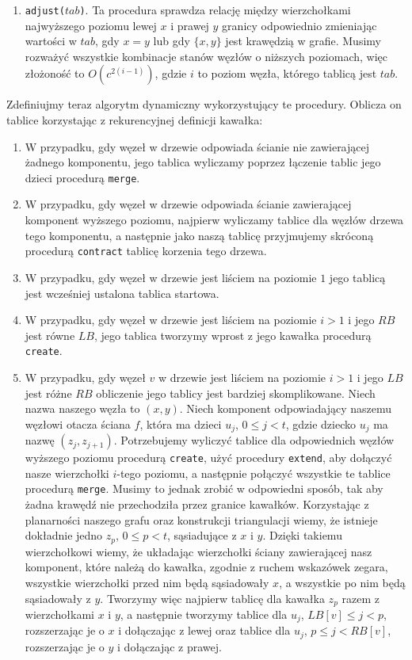 \documentclass[twoside,a4paper,12pt]{report} %
\theoremstyle{break}
\begin{document}
\begin{enumerate}
    \item \texttt{adjust($tab$)}. Ta procedura sprawdza relację między wierzchołkami najwyższego poziomu lewej $x$ i prawej $y$ granicy odpowiednio zmieniając wartości w $tab$, gdy $x=y$ lub gdy $\{x,y\}$ jest krawędzią w grafie. Musimy rozważyć wszystkie kombinacje stanów węzłów o niższych poziomach, więc złożoność to $O(c^{2(i-1)})$, gdzie $i$ to poziom węzła, którego tablicą jest $tab$.
\end{enumerate}

Zdefiniujmy teraz algorytm dynamiczny wykorzystujący te procedury. Oblicza on tablice korzystając z rekurencyjnej definicji kawałka:

\begin{enumerate}
    \item W przypadku, gdy węzeł w drzewie odpowiada ścianie nie zawierającej żadnego komponentu, jego tablica wyliczamy poprzez łączenie tablic jego dzieci procedurą \texttt{merge}.
    \item W przypadku, gdy węzeł w drzewie odpowiada ścianie zawierającej komponent wyższego poziomu, najpierw wyliczamy tablice dla węzłów drzewa tego komponentu, a następnie jako naszą tablicę przyjmujemy skróconą procedurą \texttt{contract} tablicę korzenia tego drzewa.
    \item W przypadku, gdy węzeł w drzewie jest liściem na poziomie $1$ jego tablicą jest wcześniej ustalona tablica startowa.
    \item W przypadku, gdy węzeł w drzewie jest liściem na poziomie $i>1$ i jego $RB$ jest równe $LB$, jego tablica tworzymy wprost z jego kawałka procedurą \texttt{create}.
    \item W przypadku, gdy węzeł $v$ w drzewie jest liściem na poziomie $i>1$ i jego $LB$ jest różne $RB$ obliczenie jego tablicy jest bardziej skomplikowane. Niech nazwa naszego węzła to $(x,y)$. Niech komponent odpowiadający naszemu węzłowi otacza ściana $f$, która ma dzieci $u_j$, $0 \le j < t$, gdzie dziecko $u_j$ ma nazwę $(z_j, z_{j+1})$. Potrzebujemy wyliczyć tablice dla odpowiednich węzłów wyższego poziomu procedurą \texttt{create}, użyć procedury \texttt{extend}, aby dołączyć nasze wierzchołki $i$-tego poziomu, a następnie połączyć wszystkie te tablice procedurą \texttt{merge}. Musimy to jednak zrobić w odpowiedni sposób, tak aby żadna krawędź nie przechodziła przez granice kawałków. Korzystając z planarności naszego grafu oraz konstrukcji triangulacji wiemy, że istnieje dokładnie jedno $z_p$, $0 \le p < t$, sąsiadujące z $x$ i $y$. Dzięki takiemu wierzchołkowi wiemy, że układając wierzchołki ściany zawierającej nasz komponent, które należą do kawałka, zgodnie z ruchem wskazówek zegara, wszystkie wierzchołki przed nim będą sąsiadowały $x$, a wszystkie po nim będą sąsiadowały z $y$. Tworzymy więc najpierw tablicę dla kawałka $z_p$ razem z wierzchołkami $x$ i $y$, a następnie tworzymy tablice dla $u_j$, $LB[v] \le j < p$, rozszerzając je o $x$ i dołączając z lewej oraz tablice dla $u_j$, $p \le j < RB[v]$, rozszerzając je o $y$ i dołączając z prawej.
\end{enumerate}
\end{document}
